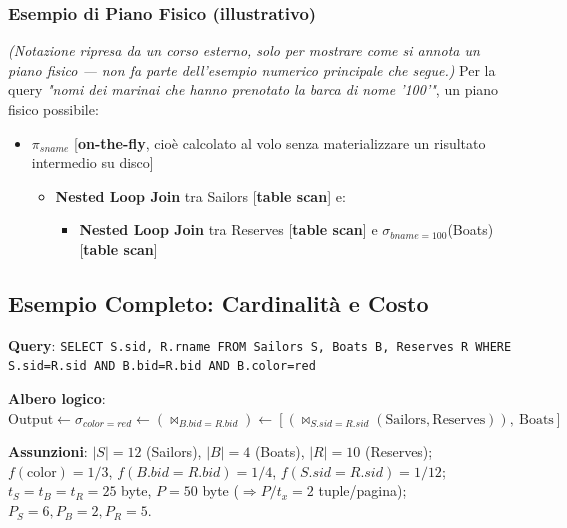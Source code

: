 \documentclass[12pt, a4paper]{article}
\begin{document}
\subsubsection{Esempio di Piano Fisico (illustrativo)}
\textit{(Notazione ripresa da un corso esterno, solo per mostrare come si annota un piano fisico — non fa parte dell'esempio numerico principale che segue.)} Per la query \textit{"nomi dei marinai che hanno prenotato la barca di nome '100'"}, un piano fisico possibile:
\begin{itemize}
    \item $\pi_{sname}$ [\textbf{on-the-fly}, cioè calcolato al volo senza materializzare un risultato intermedio su disco]
    \begin{itemize}
        \item \textbf{Nested Loop Join} tra Sailors [\textbf{table scan}] e:
        \begin{itemize}
            \item \textbf{Nested Loop Join} tra Reserves [\textbf{table scan}] e $\sigma_{bname=100}$(Boats) [\textbf{table scan}]
        \end{itemize}
    \end{itemize}
\end{itemize}

\subsection{Esempio Completo: Cardinalità e Costo}

\textbf{Query}: \texttt{SELECT S.sid, R.rname FROM Sailors S, Boats B, Reserves R WHERE S.sid=R.sid AND B.bid=R.bid AND B.color=red}

\textbf{Albero logico}: $\text{Output} \leftarrow \sigma_{color=red} \leftarrow (\bowtie_{B.bid=R.bid}) \leftarrow \left[(\bowtie_{S.sid=R.sid} (\text{Sailors},\text{Reserves})),\ \text{Boats}\right]$

\textbf{Assunzioni}: $|S|{=}12$ (Sailors), $|B|{=}4$ (Boats), $|R|{=}10$ (Reserves); $f(\text{color}){=}1/3$, $f(B.bid{=}R.bid){=}1/4$, $f(S.sid{=}R.sid){=}1/12$; $t_S{=}t_B{=}t_R{=}25$ byte, $P{=}50$ byte ($\Rightarrow P/t_x=2$ tuple/pagina); $P_S{=}6, P_B{=}2, P_R{=}5$.
\end{document}
